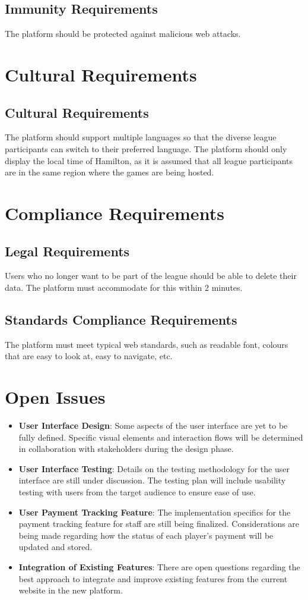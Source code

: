 \documentclass[12pt]{article}
\begin{document}
\subsection{Immunity Requirements}
The platform should be protected against malicious web attacks.

\section{Cultural Requirements}
\subsection{Cultural Requirements}
The platform should support multiple languages so that the diverse league participants can switch to their preferred language. The platform should only display the local time of Hamilton, as it is assumed that all league participants are in the same region where the games are being hosted.

\section{Compliance Requirements}
\subsection{Legal Requirements}
Users who no longer want to be part of the league should be able to delete their data. The platform must accommodate for this within 2 minutes.

\subsection{Standards Compliance Requirements}
The platform must meet typical web standards, such as readable font, colours that are easy to look at, easy to navigate, etc.

\section{Open Issues}
\begin{itemize}
    \item \textbf{User Interface Design}: Some aspects of the user interface are yet to be fully defined. Specific visual elements and interaction flows will be determined in collaboration with stakeholders during the design phase.
    \item \textbf{User Interface Testing}: Details on the testing methodology for the user interface are still under discussion. The testing plan will include usability testing with users from the target audience to ensure ease of use.
    \item \textbf{User Payment Tracking Feature}: The implementation specifics for the payment tracking feature for staff are still being finalized. Considerations are being made regarding how the status of each player's payment will be updated and stored.
    \item \textbf{Integration of Existing Features}: There are open questions regarding the best approach to integrate and improve existing features from the current website in the new platform.
\end{itemize}
\end{document}
